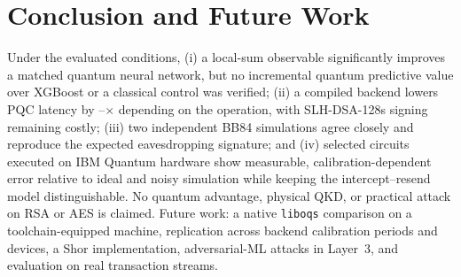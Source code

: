 \section{Conclusion and Future Work}\label{sec:concl}
Under the evaluated conditions, (i) a local-sum observable significantly improves a matched quantum neural network, but no incremental quantum predictive value over XGBoost or a classical control was verified; (ii) a compiled backend lowers PQC latency by \SpeedupMin{}--\SpeedupMax{}$\times$ depending on the operation, with SLH-DSA-128s signing remaining costly; (iii) two independent BB84 simulations agree closely and reproduce the expected eavesdropping signature; and (iv) selected circuits executed on IBM Quantum hardware show measurable, calibration-dependent error relative to ideal and noisy simulation while keeping the intercept--resend model distinguishable. No quantum advantage, physical QKD, or practical attack on RSA or AES is claimed. Future work: a native \texttt{liboqs} comparison on a toolchain-equipped machine, replication across backend calibration periods and devices, a Shor implementation, adversarial-ML attacks in Layer~3, and evaluation on real transaction streams.
